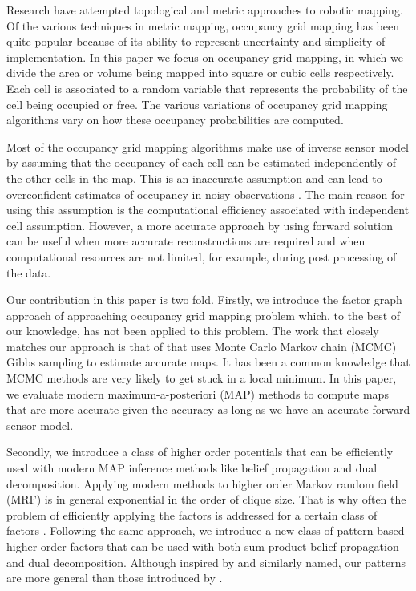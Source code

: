 \documentclass[letterpaper, 10 pt, conference]{ieeeconf} %
\begin{document}
Research have attempted topological and metric approaches to robotic mapping.
Of the various techniques in metric mapping, occupancy grid mapping has been
quite popular \cite{elfes1989using,moravec1988sensor} because of its ability
to represent uncertainty and simplicity of implementation.
In this paper we focus on occupancy grid mapping, in which we divide the area
or volume being mapped into square or cubic cells respectively. Each cell is
associated to a random variable that represents the probability of the cell
being occupied or free. The various variations of occupancy grid mapping
algorithms vary on how these occupancy probabilities are computed.

Most of the occupancy grid mapping algorithms make use of inverse sensor
model by assuming that the occupancy of each cell can be estimated
independently of the other cells in the map.
This is an inaccurate assumption and can lead to overconfident estimates of
occupancy in noisy observations \cite{thrun2003learning,merali2013icra}. The
main reason for using this assumption is the computational efficiency
associated with independent cell assumption.
However, a more accurate approach by using forward solution can be useful when
more accurate reconstructions are required and when computational resources
are not limited, for example, during post processing of the data.

Our contribution in this paper is two fold. Firstly, we introduce the factor
graph approach of approaching occupancy grid mapping problem which, to the
best of our knowledge, has not been applied to this problem. The work that
closely matches our approach is that of \cite{merali2013icra} that uses Monte
Carlo Markov chain (MCMC) Gibbs sampling to estimate accurate maps. It has been a
common knowledge that MCMC methods are very likely to get stuck in a local
minimum. In this paper, we evaluate modern maximum-a-posteriori (MAP) methods
to compute maps that are more accurate given the accuracy as long as we have
an accurate forward sensor model. 

Secondly, we introduce a class of higher
order potentials that can be efficiently used with modern MAP inference 
methods like belief propagation and dual decomposition. Applying 
modern methods to higher order Markov random field (MRF) is in general
exponential in the order of clique size.
That is why often the problem of efficiently applying the factors is addressed
for a certain class of factors \cite{komodakis2009beyond,leonardis2006efficient,potetz2007efficient}.
Following the same approach, we introduce a new class of pattern based higher
order factors that can be used with both sum product belief propagation and
dual decomposition.  Although inspired by \cite{komodakis2009beyond} and
similarly named, our patterns are more general than those introduced by
\cite{komodakis2009beyond}.
\end{document}

